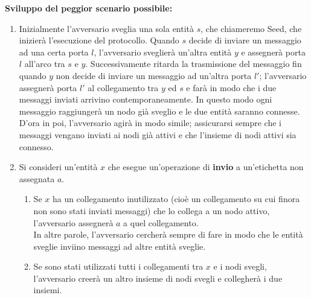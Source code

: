 \textbf{Sviluppo del peggior scenario possibile:}
\begin{enumerate}
    \item Inizialmente l'avversario sveglia una sola entità $s$, che chiameremo
          Seed, che inizierà l'esecuzione del protocollo. Quando $s$ decide di
          inviare un messaggio ad una certa porta $l$, l'avversario sveglierà
          un'altra entità $y$ e assegnerà porta $l$ all'arco tra $s$ e $y$.
          Successivamente ritarda la trasmissione del messaggio fin quando $y$
          non decide di inviare un messaggio ad un'altra porta $l'$;
          l'avversario assegnerà porta $l'$ al collegamento tra $y$ ed $s$ e
          farà in modo che i due messaggi inviati arrivino contemporaneamente.
          In questo modo ogni messaggio raggiungerà un nodo già sveglio e le due
          entità saranno connesse.\\
          D'ora in poi, l'avversario agirà in modo simile; assicurarsi sempre
          che i messaggi vengano inviati ai nodi già attivi e che l'insieme di
          nodi attivi sia connesso.
    \item Si consideri un'entità $x$ che esegue un'operazione di \textbf{invio}
          a un'etichetta non assegnata $a$.
          \begin{enumerate}
              \item Se $x$ ha un collegamento inutilizzato (cioè un collegamento
                    su cui finora non sono stati inviati messaggi) che lo
                    collega a un nodo attivo, l'avversario assegnerà $a$ a quel
                    collegamento.\\
                    In altre parole, l'avversario cercherà sempre di fare in
                    modo che le entità sveglie inviino messaggi ad altre entità
                    sveglie.
              \item Se sono stati utilizzati tutti i collegamenti tra $x$ e i
                    nodi svegli, l'avversario creerà un altro insieme di nodi
                    svegli e collegherà i due insiemi.
\end{enumerate}
\end{enumerate}
